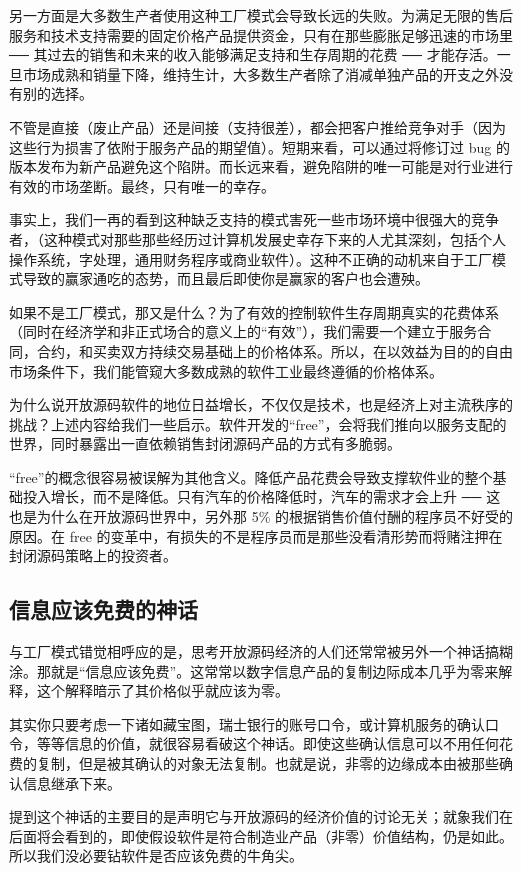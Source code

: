 另一方面是大多数生产者使用这种工厂模式会导致长远的失败。为满足无限的售后服务和技术支持需要的固定价格产品提供资金，只有在那些膨胀足够迅速的市场里 ── 其过去的销售和未来的收入能够满足支持和生存周期的花费 ── 才能存活。一旦市场成熟和销量下降，维持生计，大多数生产者除了消减单独产品的开支之外没有别的选择。


不管是直接（废止产品）还是间接（支持很差），都会把客户推给竞争对手（因为这些行为损害了依附于服务产品的期望值）。短期来看，可以通过将修订过 bug 的版本发布为新产品避免这个陷阱。而长远来看，避免陷阱的唯一可能是对行业进行有效的市场垄断。最终，只有唯一的幸存。


事实上，我们一再的看到这种缺乏支持的模式害死一些市场环境中很强大的竞争者，（这种模式对那些那些经历过计算机发展史幸存下来的人尤其深刻，包括个人操作系统，字处理，通用财务程序或商业软件）。这种不正确的动机来自于工厂模式导致的赢家通吃的态势，而且最后即使你是赢家的客户也会遭殃。


如果不是工厂模式，那又是什么？为了有效的控制软件生存周期真实的花费体系（同时在经济学和非正式场合的意义上的“有效”），我们需要一个建立于服务合同，合约，和买卖双方持续交易基础上的价格体系。所以，在以效益为目的的自由市场条件下，我们能管窥大多数成熟的软件工业最终遵循的价格体系。


为什么说开放源码软件的地位日益增长，不仅仅是技术，也是经济上对主流秩序的挑战？上述内容给我们一些启示。软件开发的“free”，会将我们推向以服务支配的世界，同时暴露出一直依赖销售封闭源码产品的方式有多脆弱。


“free”的概念很容易被误解为其他含义。降低产品花费会导致支撑软件业的整个基础投入增长，而不是降低。只有汽车的价格降低时，汽车的需求才会上升 ── 这也是为什么在开放源码世界中，另外那 5\% 的根据销售价值付酬的程序员不好受的原因。在 free 的变革中，有损失的不是程序员而是那些没看清形势而将赌注押在封闭源码策略上的投资者。


\subsection{信息应该免费的神话}
与工厂模式错觉相呼应的是，思考开放源码经济的人们还常常被另外一个神话搞糊涂。那就是“信息应该免费”。这常常以数字信息产品的复制边际成本几乎为零来解释，这个解释暗示了其价格似乎就应该为零。


其实你只要考虑一下诸如藏宝图，瑞士银行的账号口令，或计算机服务的确认口令，等等信息的价值，就很容易看破这个神话。即使这些确认信息可以不用任何花费的复制，但是被其确认的对象无法复制。也就是说，非零的边缘成本由被那些确认信息继承下来。


提到这个神话的主要目的是声明它与开放源码的经济价值的讨论无关；就象我们在后面将会看到的，即使假设软件是符合制造业产品（非零）价值结构，仍是如此。所以我们没必要钻软件是否应该免费的牛角尖。


